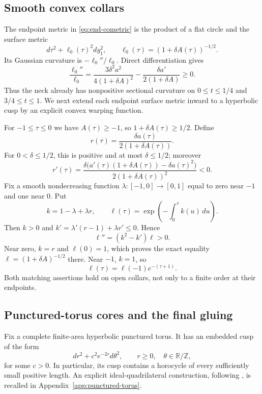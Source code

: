 \subsection{Smooth convex collars}

The endpoint metric in \eqref{eq:end-cometric} is the product of a flat
circle and the surface metric
\[
 d\tau^2+\ell_0(\tau)^2dy_1^2,
 \qquad \ell_0(\tau)=(1+\delta A(\tau))^{-1/2}.
\]
Its Gaussian curvature is $-\ell_0''/\ell_0$.  Direct differentiation
gives
\begin{equation}\label{eq:end-warp-convexity}
 \frac{\ell_0''}{\ell_0}
 =\frac{3\delta^2a^2}{4(1+\delta A)^2}
  -\frac{\delta a'}{2(1+\delta A)}\ge0.
\end{equation}
Thus the neck already has nonpositive sectional curvature on
$0\le t\le1/4$ and $3/4\le t\le1$.
We next extend each endpoint surface metric inward to a hyperbolic cusp
by an explicit convex warping function.

For $-1\le\tau\le0$ we have $A(\tau)\ge-1$, so
$1+\delta A(\tau)\ge1/2$.  Define
\[
 r(\tau)=\frac{\delta a(\tau)}{2(1+\delta A(\tau))}.
\]
For $0<\delta\le1/2$, this is positive and at most $\delta\le1/2$;
moreover
\[
 r'(\tau)=\frac{\delta\bigl(a'(\tau)(1+\delta A(\tau))
                                  -\delta a(\tau)^2\bigr)}
                         {2(1+\delta A(\tau))^2}<0.
\]
Fix a smooth nondecreasing function $\lambda:[-1,0]\to[0,1]$ equal to
zero near $-1$ and one near $0$.  Put
\begin{equation}\label{eq:collar-warp}
 k=1-\lambda+\lambda r,
 \qquad \ell(\tau)=\exp\left(-\int_0^\tau k(u)\,du\right).
\end{equation}
Then $k>0$ and
$k'=\lambda'(r-1)+\lambda r'\le0$.  Hence
\[
 \ell''=(k^2-k')\ell>0.
\]
Near zero, $k=r$ and $\ell(0)=1$, which proves the exact equality
$\ell=(1+\delta A)^{-1/2}$ there.  Near $-1$, $k=1$, so
\begin{equation}\label{eq:collar-cusp-germ}
 \ell(\tau)=\ell(-1)e^{-(\tau+1)}.
\end{equation}
Both matching assertions hold on open collars, not only to a finite
order at their endpoints.

\subsection{Punctured-torus cores and the final gluing}

Fix a complete finite-area hyperbolic punctured torus.  It has an embedded
cusp of the form
\begin{equation}\label{eq:hyperbolic-cusp}
 dr^2+c^2e^{-2r}d\theta^2,
 \qquad r\ge0,\quad \theta\in\mathbb R/\mathbb Z,
\end{equation}
for some $c>0$.  In particular, its cusp contains a horocycle of every
sufficiently small positive length.  An explicit ideal-quadrilateral
construction, following \cite[Section~5.5]{Bonahon2009}, is recalled in
Appendix~\ref{app:punctured-torus}.

